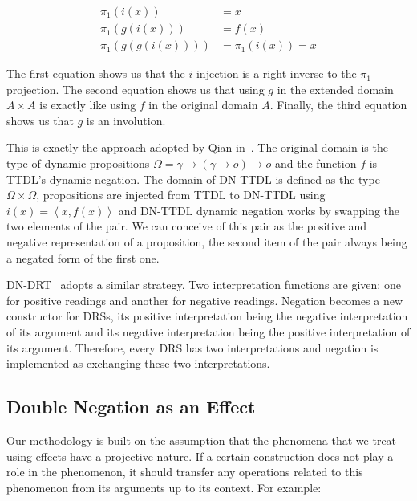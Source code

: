 \begin{align*}
\pi_1(i(x)) &= x \\
\pi_1(g(i(x))) &= f(x) \\
\pi_1(g(g(i(x)))) &= \pi_1(i(x)) = x
\end{align*}

The first equation shows us that the $i$ injection is a right inverse to
the $\pi_1$ projection. The second equation shows us that using $g$ in the
extended domain $A \times A$ is exactly like using $f$ in the original
domain $A$. Finally, the third equation shows us that $g$ is an involution.

This is exactly the approach adopted by Qian
in~\cite{qian2014accessibility}. The original domain is the type of dynamic
propositions $\Omega = \gamma \to (\gamma \to o) \to o$ and the function
$f$ is TTDL's dynamic negation. The domain of DN-TTDL is defined as the
type $\Omega \times \Omega$, propositions are injected from TTDL to DN-TTDL
using $i(x) = \left<x, f(x)\right>$ and DN-TTDL dynamic negation works by
swapping the two elements of the pair. We can conceive of this pair as the
positive and negative representation of a proposition, the second item of
the pair always being a negated form of the first one.

DN-DRT~\cite{krahmer1995negation} adopts a similar strategy. Two
interpretation functions are given: one for positive readings and another
for negative readings. Negation becomes a new constructor for DRSs, its
positive interpretation being the negative interpretation of its argument
and its negative interpretation being the positive interpretation of its
argument. Therefore, every DRS has two interpretations and negation is
implemented as exchanging these two interpretations.


\subsection{Double Negation as an Effect}

Our methodology is built on the assumption that the phenomena that we treat
using effects have a projective nature. If a certain construction does not
play a role in the phenomenon, it should transfer any operations related to
this phenomenon from its arguments up to its context. For example:

